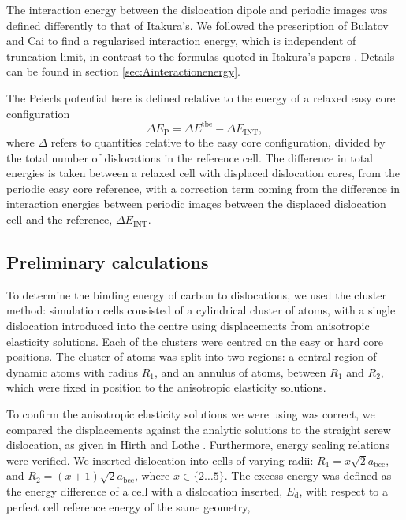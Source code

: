 \documentclass[a4paper,11pt]{article}
\begin{document}
The interaction energy between the dislocation dipole and periodic images was defined differently
to that of Itakura's. We followed the prescription of Bulatov and Cai \cite{vasilybulatov2006} to
find a regularised interaction energy, which is independent of truncation limit, in contrast to
the formulas quoted in Itakura's papers \cite{Itakura2012}. Details can be found in section \ref{sec:Ainteractionenergy}.


The Peierls potential here is defined relative to the energy of a relaxed easy core configuration
\begin{equation}
 \Delta E_{\text{P}} = \Delta E^{\text{tbe}} - \Delta E_{\text{INT}} ,\label{eq:peierlspot} 
 \end{equation} 
where \(\Delta\) refers to
quantities relative to the easy core configuration, divided by the total number of dislocations
in the reference cell.  The difference in total energies is taken between a relaxed cell with
displaced dislocation cores, from the periodic easy core reference, with a correction term coming
from the difference in interaction energies between periodic images between the displaced
dislocation cell and the reference, \(\Delta E_{\text{INT}}\).




\subsection{Preliminary calculations}
\label{sec:org79bcca9}
To determine the binding energy of carbon to dislocations, we used the
cluster method: simulation cells consisted of a cylindrical cluster of
atoms, with a single dislocation introduced into the
centre using displacements from anisotropic elasticity solutions. Each of the clusters
were centred on the easy or hard core positions. The cluster of atoms was
split into two regions: a central region of dynamic atoms with radius \(R_1\),
and an annulus of atoms, between \(R_1\) and \(R_2\), which were fixed in position to the anisotropic
elasticity solutions. 

To confirm the anisotropic elasticity solutions we were using was correct, we compared the
displacements against the analytic solutions to the straight screw dislocation, as given in Hirth
and Lothe \cite{anderson2017theory}. Furthermore, energy scaling relations were verified. We
inserted dislocation into cells of varying radii: \(R_1 = x\sqrt{2}a_{\text{bcc}}\), and \(R_2 =
   (x+1)\sqrt{2}a_{\text{bcc}}\), where \(x \in \{2\dots5\}\). The excess energy
was defined as the energy difference of a cell with a dislocation inserted, \(E_{\text{d}}\), with
respect to a perfect cell reference energy of the same geometry,
\end{document}
